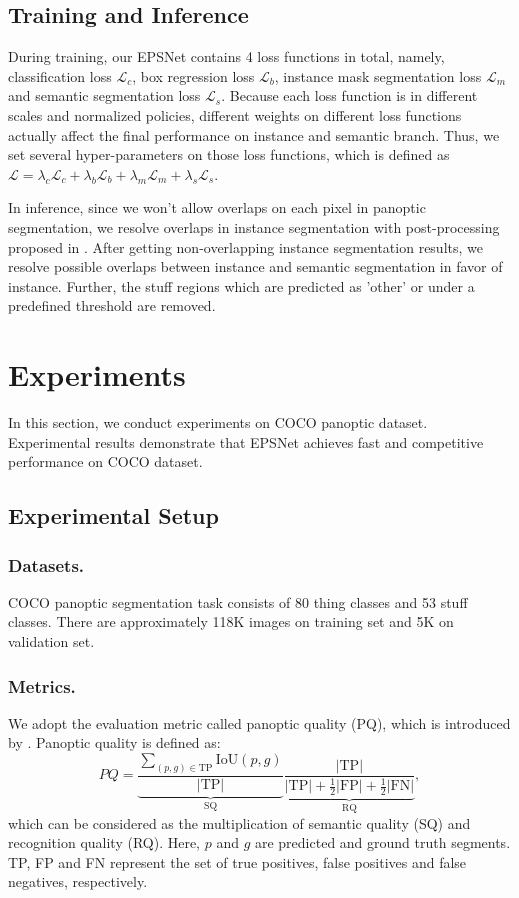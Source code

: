 \documentclass[runningheads]{llncs}
\begin{document}
\subsection{Training and Inference}
During training, our EPSNet contains 4 loss functions in total, namely,  classification loss $\mathcal{L}_c$, box regression loss $\mathcal{L}_b$, instance mask segmentation loss $\mathcal{L}_m$ and semantic segmentation loss $\mathcal{L}_s$.
Because each loss function is in different scales and normalized policies, different weights on different loss functions actually affect the final performance on instance and semantic branch. Thus, we set several hyper-parameters on those loss functions, which is defined as $\mathcal{L}=\lambda_c\mathcal{L}_c + \lambda_b\mathcal{L}_b + \lambda_m\mathcal{L}_m + \lambda_s\mathcal{L}_s $.

In inference, since we won’t allow overlaps on each pixel in panoptic segmentation, we resolve overlaps in instance segmentation with post-processing proposed in \cite{Li2018}. 
After getting non-overlapping instance segmentation results, we resolve possible overlaps between instance and semantic segmentation in favor of instance.
Further, the stuff regions which are predicted as 'other' or under a predefined threshold are removed.






\section{Experiments}
In this section, we conduct experiments on COCO \cite{Caesar2018} panoptic dataset. 
Experimental results demonstrate that EPSNet achieves fast and competitive performance on COCO dataset. 


\subsection{Experimental Setup}
\subsubsection{Datasets.}
COCO \cite{Caesar2018} panoptic segmentation task consists of 80 thing classes and 53 stuff classes. There are approximately 118K images on training set and 5K on validation set.
\subsubsection{Metrics.}
We adopt the evaluation metric called panoptic quality (PQ), which is introduced by \cite{Li2018}. Panoptic quality is defined as:
\begin{equation}
    PQ = \underbrace{\frac{\sum_{(p,g)\in \text{TP}}\text{IoU}(p,g)}{|\text{TP}|} }_{\text{SQ}}  
    \underbrace{\frac{|\text{TP}|}{|\text{TP}| + \frac{1}{2}|\text{FP}| + \frac{1}{2}|\text{FN}|}}_{\text{RQ}},
\end{equation}
which can be considered as the multiplication of semantic quality (SQ) and recognition quality (RQ). Here, $p$ and $g$ are predicted and ground truth segments. TP, FP and FN represent the set of true positives, false positives and false negatives, respectively. 
\end{document}
